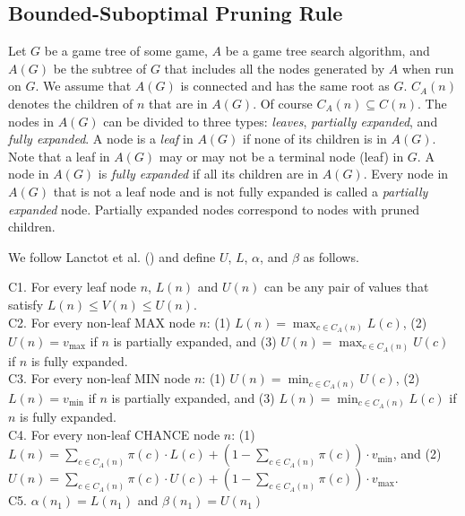 \documentclass[runningheads]{llncs}
\newcommand{\MM}{\mathit{V}}
\newcommand{\pess}{\mathit{L}}
\newcommand{\opti}{\mathit{U}}
\newcommand{\vmax}{v_{\text{max}}}
\newcommand{\vmin}{v_{\text{min}}}
\newcommand{\rootnode}{\mathit{n_1}}
\begin{document}
\subsection{Bounded-Suboptimal Pruning Rule}
Let $G$ be a game tree of some game, $A$ be a game tree search algorithm, and $A(G)$ be the subtree of $G$ that includes all the nodes generated by $A$ when run on $G$.
We assume that $A(G)$ is connected and has the same root as $G$. 
$C_A(n)$ denotes the children of $n$ that are in $A(G)$. Of course $C_A(n)\subseteq C(n)$.  
The nodes in $A(G)$ can be divided to three types: \emph{leaves}, \emph{partially expanded}, and \emph{fully expanded}.
A node is a \emph{leaf} in $A(G)$ if none of its children is in $A(G)$.
Note that a leaf in $A(G)$ may or may not be a terminal node (leaf) in $G$.  
A node in $A(G)$ is \emph{fully expanded} if all its children are in $A(G)$.
Every node in $A(G)$ that is not a leaf node and is not fully expanded is called a \emph{partially expanded} node. 
Partially expanded nodes correspond to nodes with pruned children. 


We follow Lanctot et al. (\citeyear{lanctot2013monte}) and define $\opti$, $\pess$, $\alpha$, and $\beta$ as follows. 

\noindent C1. For every leaf node $n$, $\pess(n)$ and $\opti(n)$ can be any pair of values that satisfy $\pess(n)\leq \MM(n)\leq \opti(n)$.\\ 

\noindent C2. For every non-leaf MAX node $n$: 
(1) $\pess(n)=\max_{c\in C_A(n)} \pess(c)$,
(2) $\opti(n)=\vmax$ if $n$ is partially expanded, and 
(3) $\opti(n)=\max_{c\in C_A(n)} \opti(c)$ if $n$ is fully expanded.\\

\noindent C3. For every non-leaf MIN node $n$:
(1) $\opti(n)=\min_{c\in C_A(n)} \opti(c)$, 
(2) $\pess(n)=\vmin$ if $n$ is partially expanded, and 
(3) $\pess(n)=\min_{c\in C_A(n)} \pess(c)$ if $n$ is fully expanded.\\

\noindent C4. For every non-leaf CHANCE node $n$: 
(1) $\pess(n)= \sum_{c\in C_A(n)} \pi(c)\cdot \pess(c) + 
(1-\sum_{c\in C_A(n)} \pi(c))\cdot \vmin{}$, and 
(2) $\opti(n)= \sum_{c\in C_A(n)} \pi(c)\cdot \opti(c) + 
(1-\sum_{c\in C_A(n)} \pi(c))\cdot \vmax{}$. \\

\noindent C5. $\alpha(\rootnode)=\pess(\rootnode)$ and $\beta(\rootnode)=\opti(\rootnode)$ \\
\end{document}
